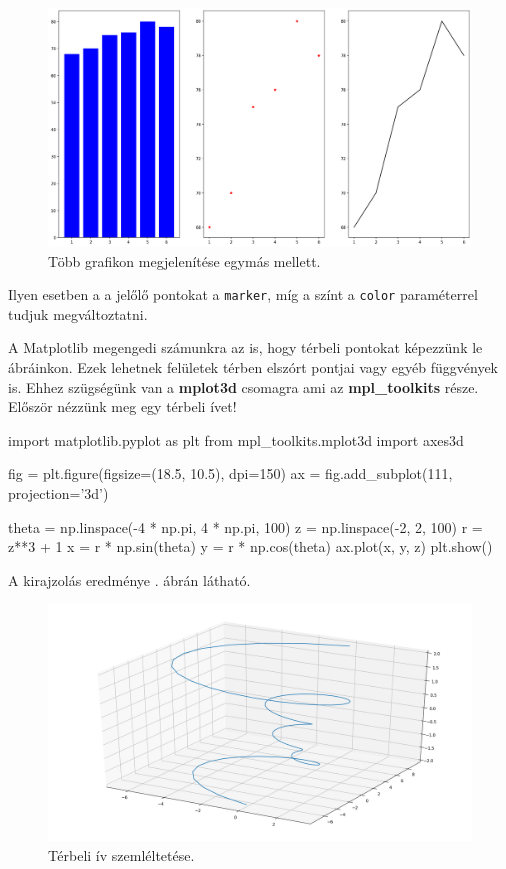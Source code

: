 \begin{figure}[h!]
\centering
\includegraphics[width=\textwidth]{img/multi-plot.png}
\caption{Több grafikon megjelenítése egymás mellett.}
\label{fig:multi-plot}
\end{figure}
    
    Ilyen esetben a a jelőlő pontokat a \texttt{marker}, míg a színt a \texttt{color} paraméterrel tudjuk megváltoztatni.
    

    A Matplotlib megengedi számunkra az is, hogy térbeli pontokat képezzünk le ábráinkon. Ezek lehetnek felületek  térben elszórt pontjai vagy egyéb függvények is. Ehhez szügségünk van a \textbf{mplot3d} csomagra
ami az \textbf{mpl\_toolkits} része.
Először nézzünk meg egy térbeli ívet!
\begin{python}
import matplotlib.pyplot as plt
from mpl_toolkits.mplot3d import axes3d

fig = plt.figure(figsize=(18.5, 10.5), dpi=150)
ax = fig.add_subplot(111, projection='3d')

theta = np.linspace(-4 * np.pi, 4 * np.pi, 100)
z = np.linspace(-2, 2, 100)
r = z**3 + 1
x = r * np.sin(theta)
y = r * np.cos(theta)
ax.plot(x, y, z)
plt.show()
\end{python}
A kirajzolás eredménye . ábrán látható.

\begin{figure}[h!]
\centering
\includegraphics[width=\textwidth]{img/curve-1.png}
\caption{Térbeli ív szemléltetése.}
\label{fig:curve-1}
\end{figure}

